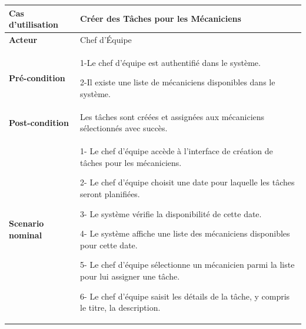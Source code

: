 \begin{table}[H]
  \centering
  \renewcommand{\arraystretch}{1} %
  \begin{tabular}{|p{4cm}|p{9cm}|}
    \hline
    \textbf{Cas d'utilisation} & Créer des Tâches pour les Mécaniciens                                                        \\
    \hline
    \textbf{Acteur}            & Chef d'Équipe                                                                                \\
    \hline
    \textbf{Pré-condition}     & 1-Le chef d'équipe est authentifié dans le système.\newline

    2-Il existe une liste de mécaniciens disponibles dans le système.                                                         \\
    \hline
    \textbf{Post-condition}    & Les tâches sont créées et assignées aux mécaniciens sélectionnés avec succès.                \\
    \hline
    \textbf{Scenario nominal}  & 1- Le chef d'équipe accède à l'interface de création de tâches pour les mécaniciens.\newline


    2- Le chef d'équipe choisit une date pour laquelle les tâches seront planifiées.\newline

    3-  Le système vérifie la disponibilité de cette date.\newline

    4- Le système affiche une liste des mécaniciens disponibles pour cette date.\newline

    5- Le chef d'équipe sélectionne un mécanicien parmi la liste pour lui assigner une tâche.\newline

    6- Le chef d'équipe saisit les détails de la tâche, y compris le titre, la description.                                   \\
  \end{tabular}

\end{table}


